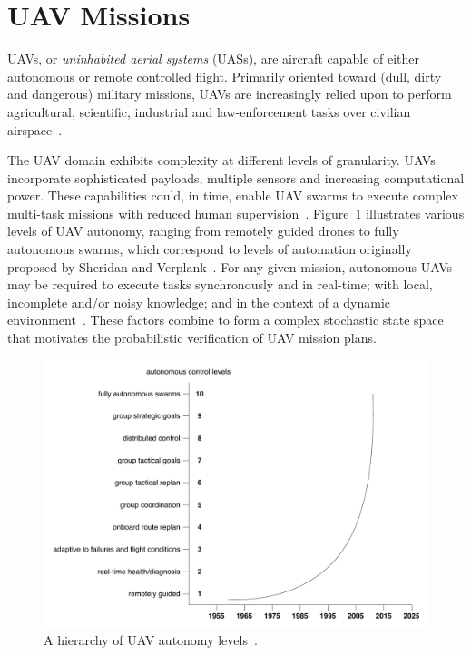 \section{UAV Missions}
\label{sec:UAV_Missions}

UAVs, or \emph{uninhabited aerial systems} (UASs), are aircraft capable of either autonomous or remote controlled flight. Primarily oriented toward (dull, dirty and dangerous) military missions, UAVs are increasingly relied upon to perform agricultural, scientific, industrial and law-enforcement tasks over civilian airspace~\cite{Rango_2010,Jimenez_Berni_2009,Heintz_2007}.

The UAV domain exhibits complexity at different levels of granularity. UAVs incorporate sophisticated payloads, multiple sensors and increasing computational power. These capabilities could, in time, enable UAV swarms to execute complex multi-task missions with reduced human supervision~\cite{Karaman_2008}. Figure~\ref{fig:UAV_autonomy} illustrates various levels of UAV autonomy, ranging from remotely guided drones to fully autonomous swarms, which correspond to levels of automation originally proposed by Sheridan and Verplank~\cite{Nowak_2007}. For any given mission, autonomous UAVs may be required to execute tasks synchronously and in real-time; with local, incomplete and/or noisy knowledge; and in the context of a dynamic environment~\cite{Tosic_2003}. These factors combine to form a complex stochastic state space that motivates the probabilistic verification of UAV mission plans.

\begin{figure}[ht]
\centering
\includegraphics[scale=0.58]{img/UAV-autonomy.pdf}
\caption[UAV autonomy hierarchy]{A hierarchy of UAV autonomy levels~\cite{Youngson_2004,DoD_2005}.}
\label{fig:UAV_autonomy}
\end{figure}

